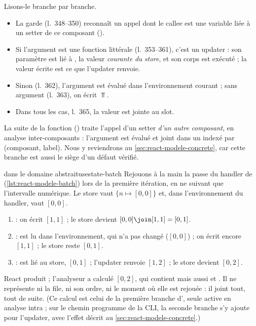 
Lisons-le branche par branche.
\begin{itemize}
  \item La garde (l.~348--350) reconnaît un appel dont le callee est une
    variable liée à un setter de ce composant ().
  \item Si l'argument est une fonction littérale (l.~353--361), c'est un
    updater : son paramètre est lié à , la valeur
    \emph{courante du store}, et son corps est exécuté ; la valeur écrite est
    ce que l'updater renvoie.
  \item Sinon (l.~362), l'argument est évalué dans l'environnement courant ;
    sans argument (l.~363), on écrit $\Top$.
  \item Dans tous les cas, l.~365, la valeur est jointe au slot.
\end{itemize}
La suite de la fonction ()
traite l'appel d'un setter \emph{d'un autre composant}, en analyse
inter-composants : l'argument est évalué et joint dans un
 indexé par (composant, label). Nous y reviendrons au
\cref{sec:react-modele-concrete}, car cette branche est aussi le siège d'un
défaut vérifié.

\begin{exemple}{ dans le domaine abstrait}{usestate-batch}
Rejouons à la main la passe du handler de  (\cref{lst:react-modele-batch}) lors de
la première itération, en ne suivant que l'intervalle numérique. Le store vaut
$\{n \mapsto [0,0]\}$ et, dans l'environnement du handler,  vaut
$[0,0]$.
\begin{enumerate}
  \item {} : on écrit $[1,1]$ ; le store devient
    $[0,0] \join [1,1] = [0,1]$.
  \item {} :  est lu dans l'environnement, qui n'a pas
    changé ($[0,0]$) ; on écrit encore $[1,1]$ ; le store reste $[0,1]$.
  \item {} :  est lié au store, $[0,1]$ ;
    l'updater renvoie $[1,2]$ ; le store devient $[0,2]$.
\end{enumerate}
React produit  ; l'analyseur a calculé $[0,2]$, qui contient 
mais aussi  et . Il ne représente ni la file, ni son ordre, ni
le moment où elle est rejouée : il joint tout, tout de suite. (Ce calcul est
celui de la première branche d', seule active en analyse
intra ; sur le chemin programme de la CLI, la seconde branche s'y ajoute pour
l'updater, avec l'effet décrit au \cref{sec:react-modele-concrete}.)
\end{exemple}


